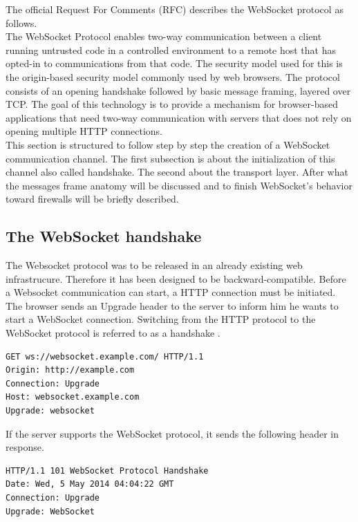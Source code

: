 The official Request For Comments \citep{Reference12} (RFC) describes the WebSocket protocol as follows.\\

The WebSocket Protocol enables two-way communication between a client running untrusted code in a controlled environment to a remote host that has opted-in to communications from that code.  The security model used for this is the origin-based security model commonly used by web browsers.  The protocol consists of an opening handshake followed by basic message framing, layered over TCP.  The goal of this technology is to provide a mechanism for browser-based applications that need two-way communication with servers that does not rely on opening multiple HTTP connections.\\

This section is structured to follow step by step the creation of a WebSocket communication channel. The first subsection is about the initialization of this channel also called handshake. The second about the transport layer. After what the messages frame anatomy will be discussed and to finish WebSocket's behavior toward firewalls will be briefly described.\\

\subsection{The WebSocket handshake}

The Websocket protocol was to be released in an already existing web infrastrucure. Therefore it has been designed to be backward-compatible. Before a Websocket communication can start, a HTTP connection must be initiated. The browser sends an Upgrade header to the server to inform him he wants to start a WebSocket connection. Switching from the HTTP protocol to the WebSocket protocol is referred to as a handshake \citep{Reference12}.\\ 

\begin{verbatim}
GET ws://websocket.example.com/ HTTP/1.1
Origin: http://example.com
Connection: Upgrade
Host: websocket.example.com
Upgrade: websocket
\end{verbatim}

If the server supports the WebSocket protocol, it sends the following header in response.\\

\begin{verbatim}
HTTP/1.1 101 WebSocket Protocol Handshake
Date: Wed, 5 May 2014 04:04:22 GMT
Connection: Upgrade
Upgrade: WebSocket
\end{verbatim}

